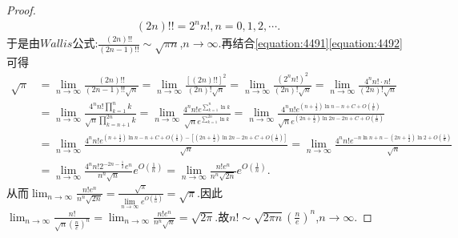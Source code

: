 \documentclass[../../main.tex]{subfiles}
\begin{document}
\begin{proof}
\begin{align}
(2n)!! = 2^n n!, n = 0,1,2,\cdots.
\end{align}
于是由\(Wallis\)公式:\(\frac{(2n)!!}{(2n - 1)!!}\sim\sqrt{\pi n}\),\(n\rightarrow\infty\).再结合\eqref{equation:4491}\eqref{equation:4492}可得
\begin{align*}
\sqrt{\pi}&=\underset{n\rightarrow \infty}{\lim}\frac{\left( 2n \right) !!}{\left( 2n-1 \right) !!\sqrt{n}}=\underset{n\rightarrow \infty}{\lim}\frac{\left[ \left( 2n \right) !! \right] ^2}{\left( 2n \right) !\sqrt{n}}=\underset{n\rightarrow \infty}{\lim}\frac{\left( 2^nn! \right) ^2}{\left( 2n \right) !\sqrt{n}}=\underset{n\rightarrow \infty}{\lim}\frac{4^nn!\cdot n!}{\left( 2n \right) !\sqrt{n}}
\\
&=\underset{n\rightarrow \infty}{\lim}\frac{4^nn!\prod\limits_{k=1}^n{k}}{\sqrt{n}\prod\limits_{k=n+1}^{2n}{k}}=\underset{n\rightarrow \infty}{\lim}\frac{4^nn!e^{\sum\limits_{k=1}^n{\ln k}}}{\sqrt{n}e^{\sum\limits_{k=1}^{2n}{\ln k}}}=\underset{n\rightarrow \infty}{\lim}\frac{4^nn!e^{\left( n+\frac{1}{2} \right) \ln n-n+C+O\left( \frac{1}{n} \right)}}{\sqrt{n}e^{\left( 2n+\frac{1}{2} \right) \ln 2n-2n+C+O\left( \frac{1}{n} \right)}}
\\
&=\underset{n\rightarrow \infty}{\lim}\frac{4^nn!e^{\left( n+\frac{1}{2} \right) \ln n-n+C+O\left( \frac{1}{n} \right) -\left[ \left( 2n+\frac{1}{2} \right) \ln 2n-2n+C+O\left( \frac{1}{n} \right) \right]}}{\sqrt{n}}=\underset{n\rightarrow \infty}{\lim}\frac{4^nn!e^{-n\ln n+n-\left( 2n+\frac{1}{2} \right) \ln 2+O\left( \frac{1}{n} \right)}}{\sqrt{n}}
\\
&=\underset{n\rightarrow \infty}{\lim}\frac{4^nn!2^{-2n-\frac{1}{2}}e^n}{n^n\sqrt{n}}e^{O\left( \frac{1}{n} \right)}=\underset{n\rightarrow \infty}{\lim}\frac{n!e^n}{n^n\sqrt{2n}}e^{O\left( \frac{1}{n} \right)}.
\end{align*}
从而\(\lim_{n\rightarrow\infty}\frac{n!e^n}{n^n\sqrt{2n}}=\frac{\sqrt{\pi}}{\lim\limits_{n\rightarrow\infty}e^{O\left(\frac{1}{n}\right)}}=\sqrt{\pi}\).因此\(\lim_{n\rightarrow\infty}\frac{n!}{\sqrt{n}\left(\frac{n}{e}\right)^n}=\lim_{n\rightarrow\infty}\frac{n!e^n}{n^n\sqrt{n}}=\sqrt{2\pi}\).故\(n!\sim\sqrt{2\pi n}\left(\frac{n}{e}\right)^n\),\(n\rightarrow\infty\).
\end{proof}
\end{document}
